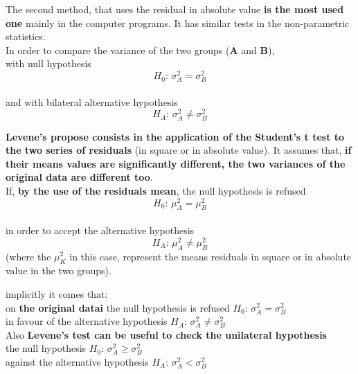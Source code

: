 \begin{frame}
  \vspace*{.25cm}
  The second method, that uses the residual in absolute value \textbf{is the most used one} mainly in the computer programs. It has similar tests in the non-parametric statistics.\\
  \vspace*{.5cm}
  In order to compare the variance of the two groups (\textbf{A} and \textbf{B}),\\
  \vspace*{.25cm}
  with null hypothesis
  $$ H_0: \, \sigma^2_A = \sigma^2_B $$\\
  \vspace*{.5cm}
  and with bilateral alternative hypothesis
  $$ H_A: \, \sigma^2_A \neq \sigma^2_B $$
\end{frame}

\begin{frame}
  \vspace*{.25cm}
  \textbf{Levene's propose consists in the application of the Student's t test to the two series of residuals} (in square or in absolute value). It assumes that, \textbf{ if their means values are significantly different, the two variances of the original data are different too}.\\
  \vspace*{.5cm}
  If, \textbf{by the use of the residuals mean}, the null hypothesis is refused
  $$ H_0: \, \mu^2_A = \mu^2_B $$\\
  \vspace*{.25cm}
  in order to accept the alternative hypothesis
  $$ H_A: \, \mu^2_A \neq \mu^2_B $$
  (where the $ \mu^2_K $ in this case, represent the means residuals in square or in absolute value in the two groups).
\end{frame}

\begin{frame}
  \vspace*{.25cm}
  implicitly it comes that:\\
  \vspace*{.5cm}
  on \textbf{the original datai} the null hypothesis is refused \hspace*{1.3cm} $ H_0: \, \sigma^2_A = \sigma^2_B $ \\
  \vspace*{.5cm}
  in favour of the alternative hypothesis \hspace*{2.6cm} $ H_A: \, \sigma^2_A \neq \sigma^2_B $\\
  \vspace*{1cm}
  Also \textbf{Levene's test can be useful to check the unilateral hypothesis}\\
  \vspace*{.25cm}
  the null hypothesis \hspace*{5.5cm} $ H_0: \, \sigma^2_A \geq \sigma^2_B $ \\	
  \vspace*{.5cm}
  against the alternative hypothesis \hspace*{3.4cm} $ H_A: \, \sigma^2_A < \sigma^2_B $\\
\end{frame}


